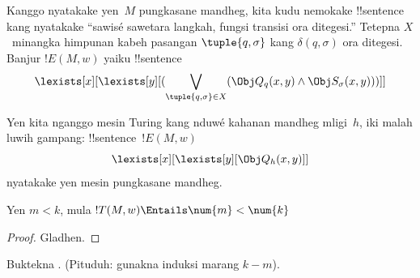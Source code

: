 \documentclass[../../../include/open-logic-section]{subfiles}
\begin{document}
Kanggo nyatakake yen~$M$ pungkasane mandheg,
kita kudu nemokake !!{sentence} kang nyatakake
``sawisé sawetara langkah, fungsi transisi
ora ditegesi.'' Tetepna $X$~minangka himpunan
kabeh pasangan $\tuple{q, \sigma}$ kang
$\delta(q, \sigma)$ ora ditegesi.
Banjur $!E(M, w)$ yaiku !!{sentence}
\[
\lexists[x][\lexists[y][(\bigvee_{\tuple{q, \sigma} \in
      X}(\Obj Q_q(x, y) \land \Obj S_\sigma(x, y)))]]
\]

Yen kita nganggo mesin Turing kang nduwé
kahanan mandheg mligi~$h$, iki malah luwih
gampang: !!{sentence}~$!E(M, w)$
\[
\lexists[x][\lexists[y][\Obj Q_h(x, y)]]
\]
nyatakake yen mesin pungkasane mandheg.

\begin{prop}
Yen $m < k$, mula $!T(M, w) \Entails \num{m} < \num{k}$
\end{prop}

\begin{proof}
Gladhen.
\end{proof}

\begin{prob}
Buktekna .
(Pituduh: gunakna induksi marang $k-m$).
\end{prob}
\end{document}
